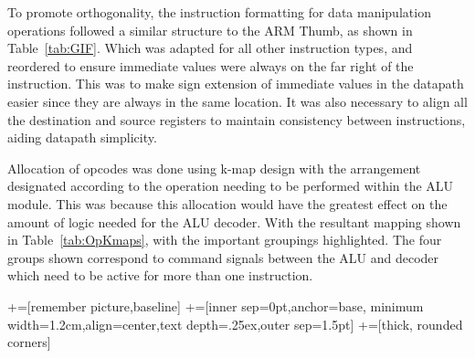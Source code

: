 To promote orthogonality, the instruction formatting for data manipulation operations followed a similar structure to the ARM Thumb, as shown in Table~\ref{tab:GIF}. 
Which was adapted for all other instruction types, and reordered to ensure immediate values were always on the far right of the instruction. 
This was to make sign extension of immediate values in the datapath easier since they are always in the same location.
It was also necessary to align all the destination and source registers to maintain consistency between instructions, aiding datapath simplicity. 

Allocation of opcodes was done using k-map design with the arrangement designated according to the operation needing to be performed within the ALU module. 
This was because this allocation would have the greatest effect on the amount of logic needed for the ALU decoder. 
With the resultant mapping shown in Table~\ref{tab:OpKmaps}, with the important groupings highlighted. 
The four groups shown correspond to command signals between the ALU and decoder which need to be active for more than one instruction. 

\newcommand\tabnode[1]{\addtocounter{nodecount}{1} \tikz \node (\arabic{nodecount}) {#1};}

\newcommand\newcell[1]{\hspace{-0.5mm}\tabnode{#1}\hspace{-0.5mm}}

+=[remember picture,baseline]
+=[inner sep=0pt,anchor=base,
minimum width=1.2cm,align=center,text depth=.25ex,outer sep=1.5pt]
+=[thick, rounded corners]

\newcommand{\darkercolor}[3]{%
    \colorlet{#3}{#1!#2!black}
}
\darkercolor{green}{60}{darkgreen}

